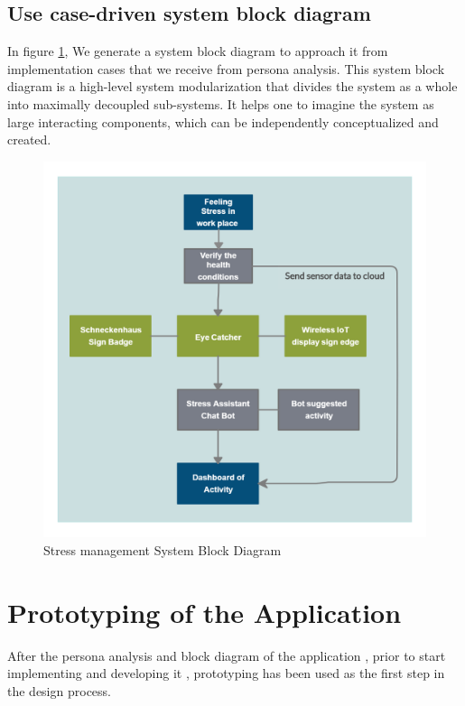 \subsection{Use case-driven system block diagram}
In figure \ref{fig:system_block}, We generate a system block diagram to approach it from implementation cases that we receive from persona analysis. This system block diagram is a high-level system modularization that divides the system as a whole into maximally decoupled sub-systems. It helps one to imagine the system as large interacting components, which can be independently conceptualized and created.
\begin{figure}[h] 
  \centering
  \includegraphics[width=1\textwidth]{chap4/block1.png} %
  \caption[Stress management System Block Diagram]{Stress management System Block Diagram }
  \label{fig:system_block}
\end{figure}

\section{Prototyping of the Application}

After the persona analysis and block diagram of the application , prior to start implementing and developing it , prototyping has been used as the first step in the design process.

